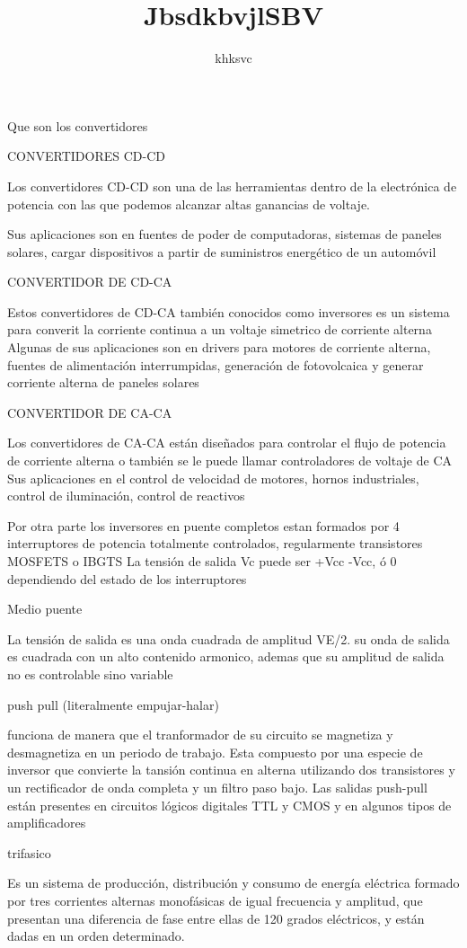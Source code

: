 \documentclass[10pt,a4paper]{article}
\author{khksvc}
\title{JbsdkbvjlSBV}
\begin{document}
Que son los convertidores


CONVERTIDORES CD-CD


Los convertidores CD-CD son una de las herramientas dentro de la electrónica de potencia con las que podemos alcanzar altas ganancias de voltaje.

Sus aplicaciones son en fuentes de poder de computadoras, sistemas de paneles solares, cargar dispositivos a partir de suministros energético de un automóvil


CONVERTIDOR DE CD-CA


Estos convertidores de CD-CA también conocidos como inversores es un sistema para converit la corriente continua a un voltaje simetrico de corriente alterna
Algunas de sus aplicaciones son en drivers para motores de corriente alterna, fuentes de alimentación interrumpidas, generación de fotovolcaica y generar corriente alterna de paneles solares


CONVERTIDOR DE CA-CA


Los convertidores de CA-CA están diseñados para controlar el flujo de potencia de corriente alterna o también se le puede llamar controladores de voltaje de CA
Sus aplicaciones en el control de velocidad de motores, hornos industriales, control de iluminación, control de reactivos

Por otra parte los inversores en puente completos estan formados por 4 interruptores de potencia totalmente controlados, regularmente transistores MOSFETS o IBGTS La tensión de salida Vc puede ser +Vcc -Vcc, ó 0 dependiendo del estado de los interruptores


Medio puente

La tensión de salida es una onda cuadrada de amplitud VE/2. su onda de salida es cuadrada con un alto contenido armonico, ademas que su amplitud de salida no es controlable sino variable


push pull (literalmente empujar-halar)

funciona de manera que el tranformador de su circuito se magnetiza y desmagnetiza en un periodo de trabajo. Esta compuesto por una especie de inversor que convierte la tansión continua en alterna utilizando dos transistores y un rectificador de onda completa y un filtro paso bajo.
Las salidas push-pull están presentes en circuitos lógicos digitales TTL y CMOS y en algunos tipos de amplificadores


trifasico 

Es un sistema de producción, distribución y consumo de energía eléctrica formado por tres corrientes alternas monofásicas de igual frecuencia y amplitud, que presentan una diferencia de fase entre ellas de 120 grados eléctricos, y están dadas en un orden determinado.
\end{document}
